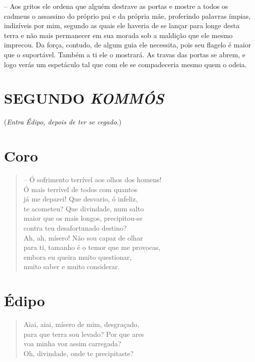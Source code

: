  --   Aos gritos ele ordena que alguém destrave as portas e mostre a todos os
cadmeus o assassino do próprio pai e da própria mãe, proferindo palavras
ímpias, indizíveis por  mim, segundo as quais ele haveria de se
lançar para longe desta terra e não mais permanecer em sua morada sob a
maldição que ele mesmo imprecou. Da força, contudo, de algum guia ele
necessita, pois seu flagelo é maior que o suportável. Também a ti ele o
mostrará. As travas das portas se abrem, e logo verás um espetáculo tal
que com ele se compadeceria mesmo quem o odeia.


\section{SEGUNDO \emph{KOMMÓS}}

(\emph{Entra Édipo, depois de ter se cegado.})


\section{Coro} 

\begin{verse} -- Ó sofrimento terrível aos olhos dos homens!\\
Ó mais terrível de todos com quantos\\
já me deparei! Que desvario, ó infeliz,\\
te acometeu? Que divindade, num salto\\ 
maior que os mais longos, precipitou-se\\
contra teu desafortunado destino?\\
Ah, ah, mísero! Não sou capaz de olhar\\
para ti, tamanho é o temor que me provocas,\\
embora eu queira muito questionar,\\
muito saber e muito considerar.
\end{verse}

\section{Édipo} 

\begin{verse}Aiai, aiai, mísero de mim, desgraçado,\\
para que terra sou levado? Por que ares\\ 
voa minha voz assim carregada?\\
Oh, divindade, onde te precipitaste?
\end{verse}

